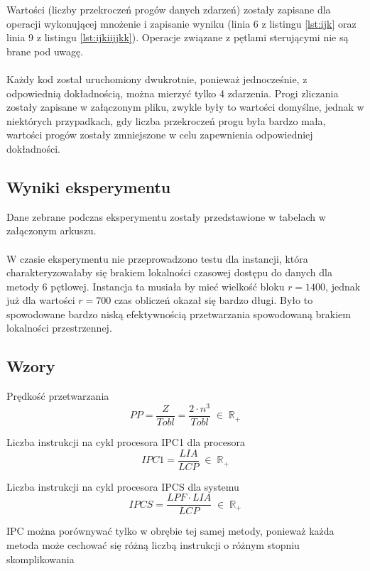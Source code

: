 \documentclass[12pt,a4paper]{article}
\begin{document}
Wartości (liczby przekroczeń progów danych zdarzeń) zostały zapisane dla operacji wykonującej mnożenie i zapisanie wyniku (linia 6  z listingu \ref{lst:ijk} oraz linia 9 z listingu \ref{lst:ijkiijjkk}). Operacje związane z pętlami sterującymi nie są brane pod uwagę. 
\\
\\
Każdy kod został uruchomiony dwukrotnie, ponieważ jednocześnie, z odpowiednią dokładnością, można mierzyć tylko 4 zdarzenia. Progi zliczania zostały zapisane w załączonym pliku, zwykle były to wartości domyślne, jednak w niektórych przypadkach, gdy liczba przekroczeń progu była bardzo mała, wartości progów zostały zmniejszone w celu zapewnienia odpowiedniej dokładności.

\subsection{Wyniki eksperymentu}

Dane zebrane podczas eksperymentu zostały przedstawione w tabelach w załączonym arkuszu.\\
\\
W czasie eksperymentu nie przeprowadzono testu dla instancji, która charakteryzowałaby się brakiem lokalności czasowej dostępu do danych dla metody 6 pętlowej. Instancja ta musiała by mieć wielkość bloku $r=1400$, jednak już dla wartości $r=700$ czas obliczeń okazał się bardzo długi. Było to spowodowane bardzo niską efektywnością przetwarzania spowodowaną brakiem lokalności przestrzennej.

\subsection{Wzory}

Prędkość przetwarzania
\begin{equation}
PP = \frac{Z}{Tobl} = \frac{2 \cdot n^3}{Tobl} \; \in \; \mathbb{R}_+
\end{equation}

Liczba instrukcji na cykl procesora IPC1 dla procesora
\begin{equation}
IPC1 = \frac{LIA}{LCP} \; \in \; \mathbb{R}_+
\end{equation}

Liczba instrukcji na cykl procesora IPCS dla systemu
\begin{equation}
IPCS = \frac{LPF \cdot LIA}{LCP}
\; \in \; \mathbb{R}_+
\end{equation}

\begin{footnotesize}
\begin{center}
IPC można porównywać tylko w obrębie tej samej metody, ponieważ każda metoda może cechować się różną liczbą instrukcji o różnym stopniu skomplikowania
\end{center}
\end{footnotesize}
\end{document}
